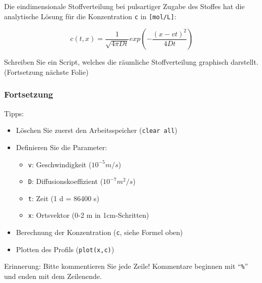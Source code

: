       \secMexercise
      \begin{frame}
          \frameMexercise
          \begin{exercise}
              \sloppy
              Die eindimensionale Stoffverteilung bei pulsartiger Zugabe des Stoffes hat die analytische Lösung für die Konzentration \texttt{c} in \texttt{[mol/L]}:

              \begin{displaymath}
                  c(t,x) = \frac{1}{\sqrt{4 \pi Dt}} exp \left( - \frac{(x-vt)^{2}}{4Dt} \right)
              \end{displaymath}

              \vspace{0.5cm}

              Schreiben Sie ein Script, welches die räumliche Stoffverteilung graphisch darstellt. (Fortsetzung nächste Folie)\\
          \end{exercise}
      \end{frame}

      \begin{frame}
          \frametitle{Fortsetzung}
          \begin{exercise}
              \sloppy
              Tipps:

              \vspace{0.2cm}

              \begin{itemize}
                  \item Löschen Sie zuerst den Arbeitsspeicher (\texttt{clear all})
                  \item Definieren Sie die Parameter:
                  \begin{itemize}
                      \item \texttt{v}: Geschwindigkeit ($10^{-5} m/s$)
                      \item \texttt{D}: Diffusionskoeffizient ($10^{-7} m^{2}/s$)
                      \item \texttt{t}: Zeit (1 d = 86400 s)
                      \item \texttt{x}: Ortsvektor (0-2 m in 1cm-Schritten)
                  \end{itemize}
                  \item Berechnung der Konzentration (\texttt{c}, siehe Formel oben)
                  \item Plotten des Profils (\texttt{plot(x,c)})
              \end{itemize}

              \vspace{0.2cm}

              \alert{Erinnerung}: Bitte kommentieren Sie jede Zeile! Kommentare beginnen mit ``\texttt{\%}'' und enden mit dem Zeilenende.

          \end{exercise}
      \end{frame}

